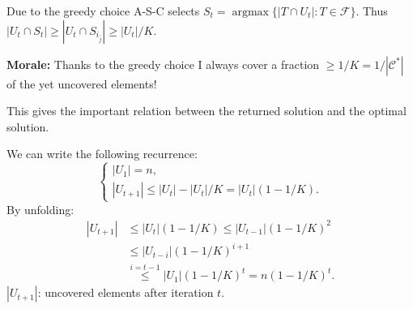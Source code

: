 Due to the greedy choice A-S-C selects
$S_t=\operatorname{argmax}\{|T\cap U_t|:T\in\mathcal F\}$.
Thus $|U_t\cap S_t|\geq|U_t\cap S_{i_{\bar j}}|\geq|U_t|/K$.
\begin{notesresult}
\textbf{Morale:} Thanks to the greedy choice I always cover a fraction
$\geq1/K=1/|\mathcal C^*|$ of the yet uncovered elements!
\end{notesresult}
This gives the important relation between the returned solution and the optimal solution.

We can write the following recurrence:
\[\begin{cases}|U_1|=n,\\
|U_{t+1}|\leq|U_t|-|U_t|/K=|U_t|(1-1/K).
\end{cases}\]
By unfolding:
\begin{align*}
|U_{t+1}|&\leq|U_t|(1-1/K)\leq|U_{t-1}|(1-1/K)^2\\
&\leq|U_{t-i}|(1-1/K)^{i+1}\\
&\overset{i=t-1}{\leq}|U_1|(1-1/K)^t=n(1-1/K)^t.
\end{align*}
$|U_{t+1}|$: uncovered elements after iteration $t$.
